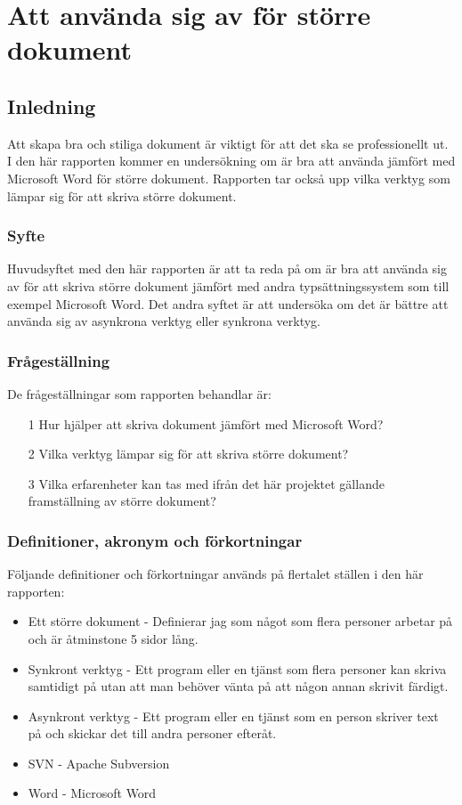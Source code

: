 \chapter{Att använda sig av \latex för större dokument}
\label{cha:indiv-report-tuhkala}

\section{Inledning}
\label{sec:introduction-tuhkala}
Att skapa bra och stiliga dokument är viktigt för att det ska se professionellt ut. I den här rapporten kommer en undersökning om \latex är bra att använda jämfört med Microsoft Word för större dokument. Rapporten tar också upp vilka verktyg som lämpar sig för att skriva större dokument.

\subsection{Syfte}
\label{sec:purpose-tuhkala}
Huvudsyftet med den här rapporten är att ta reda på om \latex är bra att använda sig av för att skriva större dokument jämfört med andra typsättningssystem som till exempel Microsoft Word. Det andra syftet är att undersöka om det är bättre att använda sig av asynkrona verktyg eller synkrona verktyg.

\subsection{Frågeställning}
\label{sec:issue-tuhkala}
De frågeställningar som rapporten behandlar är:

\begin{itemize}
	\item [1] Hur hjälper \latex att skriva dokument jämfört med Microsoft Word?
	\item [2] Vilka verktyg lämpar sig för att skriva större dokument?
	\item [3] Vilka erfarenheter kan tas med ifrån det här projektet gällande framställning av större dokument?
\end{itemize}

\subsection{Definitioner, akronym och förkortningar}
Följande definitioner och förkortningar används på flertalet ställen i den här rapporten:
\begin{itemize}
	\item Ett större dokument - Definierar jag som något som flera personer arbetar på och är åtminstone 5 sidor lång.
	\item Synkront verktyg - Ett program eller en tjänst som flera personer kan skriva samtidigt på utan att man behöver vänta på att någon annan skrivit färdigt.
	\item Asynkront verktyg - Ett program eller en tjänst som en person skriver text på och skickar det till andra personer efteråt.
	\item SVN - Apache Subversion
	\item Word - Microsoft Word
\end{itemize}

